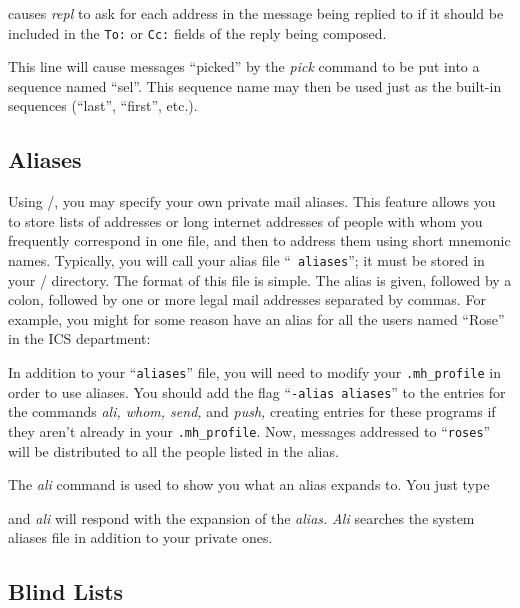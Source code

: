 
causes {\it repl\/} to ask for each address in the message being replied to
if it should be included in the {\tt To:} or {\tt Cc:} fields of the reply
being composed.


This line will cause messages ``picked'' by the {\it pick\/} command to be
put into a sequence named ``sel''.  This sequence name may then be used
just as the built-in sequences (``last'', ``first'', etc.).

\subsection{Aliases}

Using \MH/, you may specify your own private mail aliases.  This feature
allows you to store lists of addresses or long internet addresses of people
with whom you frequently correspond in one file, and then to address them
using short mnemonic names.  Typically, you will call your alias file ``{\tt
aliases}''; it must be stored in your \MH/ directory.  The format of this
file is simple. The alias is given, followed by a colon, followed by one or
more legal mail addresses separated by commas.  For example, you might for
some reason have an alias for all the users named ``Rose'' in the ICS
department:


In addition to your ``{\tt aliases}'' file, you will need to modify your
\verb|.mh_profile| in order to use aliases.  You should add the flag
``{\tt -alias aliases}'' to the entries for the commands {\it ali, whom,
send,} and {\it push,} creating entries for these programs if they aren't
already in your \verb|.mh_profile|.
Now, messages addressed to ``{\tt roses}'' will be distributed to all
the people listed in the alias.

The {\it ali\/} command is used to show you what an alias expands to.
You just type


and {\it ali\/} will respond with the expansion of the {\it alias.}  {\it
Ali\/} searches the system aliases file in addition to your private ones.

\subsection{Blind Lists}

